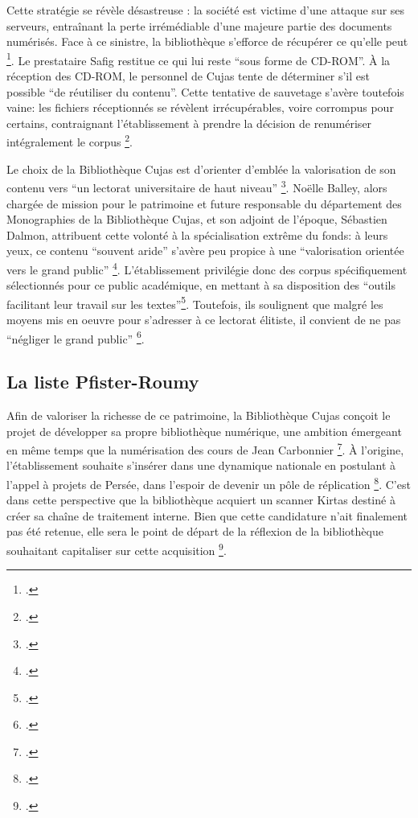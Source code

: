 Cette stratégie se révèle désastreuse : la société est victime d'une attaque sur ses serveurs, entraînant la perte irrémédiable d'une majeure partie des documents numérisés. Face à ce sinistre, la bibliothèque s'efforce de récupérer ce qu'elle peut \footcite{2006ProgrammeNumerisation}. Le prestataire Safig restitue ce qui lui reste \enquote{sous forme de CD-ROM}. À la réception des CD-ROM, le personnel de Cujas tente de déterminer s'il est possible \enquote{de réutiliser du contenu}. Cette tentative de sauvetage s'avère toutefois vaine: les fichiers réceptionnés se révèlent irrécupérables, voire corrompus pour certains, contraignant l'établissement à prendre la décision de renumériser intégralement le corpus \footnote{.}.

Le choix de la Bibliothèque Cujas est d'orienter d'emblée la valorisation de son contenu vers \enquote{un lectorat universitaire de haut niveau} \footcite{balley4ExempleMediation2012}. Noëlle Balley, alors chargée de mission pour le patrimoine et future responsable du département des Monographies de la Bibliothèque Cujas, et son adjoint de l'époque, Sébastien Dalmon, attribuent cette volonté à la spécialisation extrême du fonds: à leurs yeux, ce contenu \enquote{souvent aride} s'avère peu propice à une \enquote{valorisation orientée vers le grand public} \footcite{balley4ExempleMediation2012}. L'établissement privilégie donc des corpus spécifiquement sélectionnés pour ce public académique, en mettant à sa disposition des \enquote{outils facilitant leur travail sur les textes}\footcite{balley4ExempleMediation2012}. Toutefois, ils soulignent que malgré les moyens mis en oeuvre pour s'adresser à ce lectorat élitiste, il convient de ne pas \enquote{négliger le grand public} \footcite{balley4ExempleMediation2012}.

\subsection{La liste Pfister-Roumy}
Afin de valoriser la richesse de ce patrimoine, la Bibliothèque Cujas conçoit le projet de développer sa propre bibliothèque numérique, une ambition émergeant en même temps que la numérisation des cours de Jean Carbonnier \footcite{2006ProgrammeNumerisation}. À l'origine, l'établissement souhaite s'insérer dans une dynamique nationale en postulant à l'appel à projets de Persée, dans l'espoir de devenir un pôle de réplication \footcite{2006ProgrammeNumerisation}. C'est dans cette perspective que la bibliothèque acquiert un scanner Kirtas destiné à créer sa chaîne de traitement interne. Bien que cette candidature n'ait finalement pas été retenue, elle sera le point de départ de la réflexion de la bibliothèque souhaitant capitaliser sur cette acquisition \footcite{2007RefonteProgramme}. 


